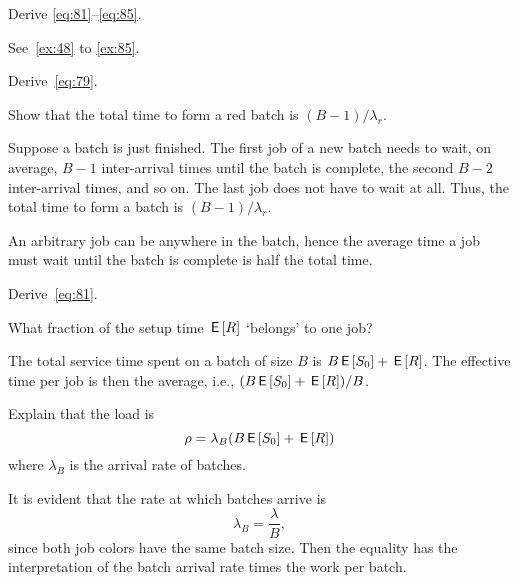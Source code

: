 \begin{exercise}\label{ex:78}
  Derive \cref{eq:81}--\cref{eq:85}.
  \begin{solution}
    See~\cref{ex:48} to \cref{ex:85}.
  \end{solution}
\end{exercise}

\begin{extra}\label{ex:48}
  Derive~\cref{eq:79}.
 \begin{hint}
 Show that the total time to form a red batch is $(B-1)/\lambda_r$. 
 \end{hint}
\begin{solution}
  Suppose a batch is just finished. The first job of a new batch needs to wait, on average, $B-1$  inter-arrival times until the batch is complete, the second $B-2$ inter-arrival times, and so on. The last job does not have to wait at all. Thus, the total time to form a batch is $(B-1)/\lambda_r$. 

An arbitrary job can be anywhere in the batch, hence the average time a job must wait until the batch is complete is half the total time. 
\end{solution}
\end{extra}


\begin{extra}
  Derive~\cref{eq:81}.
  \begin{hint}
    What fraction of the setup time $\,\mathsf{E}\left[R\right]$ `belongs' to one job?
  \end{hint}
  \begin{solution}
    The total service time spent on a batch of size $B$ is $B \,\mathsf{E}\left[S_0\right] + \,\mathsf{E}\left[R\right]$. The effective time per job is then the average, i.e.,  $(B \,\mathsf{E}\left[S_0\right]+\,\mathsf{E}\left[R\right])/B$. 
  \end{solution}
\end{extra}

\begin{extra}
Explain that the load is 
\begin{equation*}
\rho = \lambda_B (B \,\mathsf{E}\left[S_0\right] + \,\mathsf{E}\left[R\right])
\end{equation*}
where $\lambda_B$ is the arrival rate of batches. 
\begin{solution}
It is evident that the  rate at which batches arrive is 
\begin{equation*}
  \lambda_B = \frac \lambda B,
\end{equation*}
since both job colors have the same batch size.  
Then  the equality has the interpretation of the batch arrival rate times the work per batch.
\end{solution}
\end{extra}



